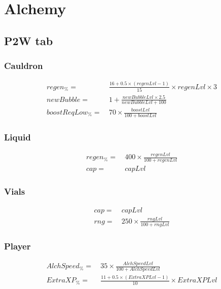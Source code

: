 \chapter{Alchemy}
    \section{P2W tab}
        \subsection{Cauldron}
            \begin{align*}
                regen_\% = &\ \frac{16 + 0.5 \times (regenLvl-1)}{15} \times regenLvl \times 3
                \\ 
                newBubble = &\ 1 + \frac{newBubbleLvl \times 2.5}{newBubbleLvl + 100}
                \\
                boostReqLow_\% = &\ 70 \times \frac{boostLvl}{100+boostLvl}
            \end{align*}

        \subsection{Liquid}
            \begin{align*}
                regen_\% = &\ 400 \times \frac{regenLvl}{100+regenLvl}
                \\
                cap = &\ capLvl
            \end{align*}
        \subsection{Vials}
            \begin{align*}
                cap =  &\ capLvl
                \\
                rng = &\ 250 \times \frac{rngLvl}{100+rngLvl}
            \end{align*}

        \subsection{Player}
            \begin{align*}
                AlchSpeed_\% = &\ 35 \times \frac{AlchSpeedLvl}{100+AlchSpeedLvl} 
                \\
                ExtraXP_\% = &\ \frac{11 + 0.5 \times (ExtraXPLvl-1)}{10} \times ExtraXPLvl
            \end{align*}
